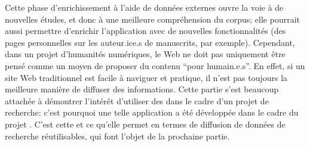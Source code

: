Cette phase d'enrichissement à l'aide de données externes ouvre la voie à de nouvelles études, et donc à une meilleure compréhension du corpus; elle pourrait aussi permettre d'enrichir l'application \ktb{} avec de nouvelles fonctionnalités (des pages personnelles sur les auteur.ice.s de manuscrits, par exemple). Cependant, dans un projet d'humanités numériques, le Web ne doit pas uniquement être pensé comme un moyen de proposer du contenu \enquote{pour humain.e.s}. En effet, si un site Web traditionnel est facile à naviguer et pratique, il n'est pas toujours la meilleure manière de diffuser des informations. Cette partie s'est beaucoup attachée à démontrer l'intérêt d'utiliser des \api{} dans le cadre d'un projet de recherche; c'est pourquoi une telle application a été développée dans le cadre du projet \mssktb{}. C'est cette \api{}  et ce qu'elle permet en termes de diffusion de données de recherche réutilisables, qui font l'objet de la prochaine partie.